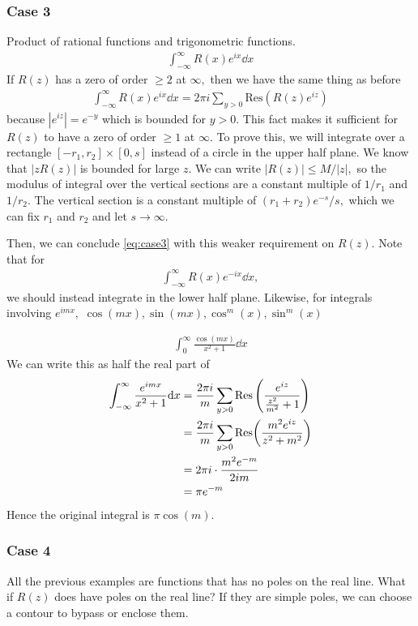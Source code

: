 \documentclass[a4paper,12pt]{article}
\begin{document}
\subsubsection{Case 3}
Product of rational functions and trigonometric functions. \begin{align}
    \int_{-\infty}^\infty R(x)e^{ix}\dd x
\end{align}
If $R(z)$ has a zero of order $\geq2$ at $\infty,$ then we have the same thing as before \begin{align}
    \int_{-\infty}^\infty R(x)e^{ix}\dd x=2\pi i\sum_{y>0}\mathrm{Res}(R(z)e^{iz})\label{eq:case3}
\end{align}
because $|e^{iz}|=e^{-y}$ which is bounded for $y>0.$ This fact makes it sufficient for $R(z)$ to have a zero of order $\geq 1$ at $\infty.$ To prove this, we will integrate over a rectangle $[-r_1,r_2]\times[0,s]$ instead of a circle in the upper half plane. We know that $|zR(z)|$ is bounded for large $z.$ We can write $|R(z)|\leq M/|z|,$ so the modulus of integral over the vertical sections are a constant multiple of $1/r_1$ and $1/r_2.$ The vertical section is a constant multiple of $(r_1+r_2)e^{-s}/s,$ which we can fix $r_1$ and $r_2$ and let $s\to\infty.$

Then, we can conclude \eqref{eq:case3} with this weaker requirement on $R(z).$ Note that for \begin{align}
    \int_{-\infty}^\infty R(x)e^{-ix}\dd x,
\end{align}
we should instead integrate in the lower half plane. Likewise, for integrals involving $e^{imx},$ $\cos(mx),\sin(mx),\cos^m(x),\sin^m(x)$
\begin{example}
    \begin{align}
        \int_{0}^\infty\frac{\cos(mx)}{x^2+1}\dd x
    \end{align}
    We can write this as half the real part of \begin{align}
        \int_{-\infty}^\infty\frac{e^{imx}}{x^2+1}\dd x&=\frac{2\pi i}{m}\sum_{y>0}\mathrm{Res}\left(\frac{e^{iz}}{\frac{z^2}{m^2}+1}\right)\\
        &=\frac{2\pi i}{m}\sum_{y>0}\Res(\frac{m^2e^{iz}}{z^2+m^2})\\
        &=2\pi i\cdot\frac{m^2e^{-m}}{2im}\\
        &=\pi e^{-m}
    \end{align}
    Hence the original integral is $\pi\cos(m).$
\end{example}
\subsubsection{Case 4}
All the previous examples are functions that has no poles on the real line. What if $R(z)$ does have poles on the real line? If they are simple poles, we can choose a contour to bypass or enclose them.
\end{document}
